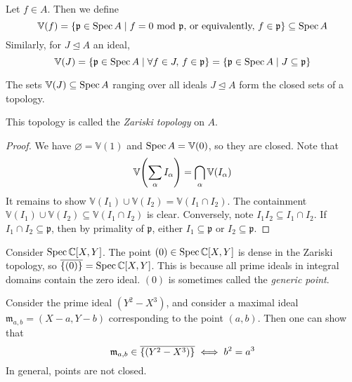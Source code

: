 \begin{definition}
    Let \( f \in A \).
    Then we define
    \[ \mathbb V(f) = \qty{\mathfrak p \in \operatorname{Spec}A \mid f = 0 \text{ mod } \mathfrak p \text{, or equivalently, } f \in \mathfrak p} \subseteq \operatorname{Spec} A \]
    Similarly, for \( J \trianglelefteq A \) an ideal,
    \[ \mathbb V(J) = \qty{\mathfrak p \in \operatorname{Spec}A \mid \forall f \in J,\, f \in \mathfrak p} = \qty{\mathfrak p \in \operatorname{Spec}A \mid J \subseteq \mathfrak p} \]
\end{definition}
\begin{proposition}
    The sets \( \mathbb V(J) \subseteq \operatorname{Spec} A \) ranging over all ideals \( J \trianglelefteq A \) form the closed sets of a topology.
\end{proposition}
This topology is called the \emph{Zariski topology} on \( A \).
\begin{proof}
    We have \( \varnothing = \mathbb V(1) \) and \( \operatorname{Spec} A = \mathbb V(0) \), so they are closed.
    Note that
    \[ \mathbb V\qty(\sum_\alpha I_\alpha) = \bigcap_\alpha \mathbb V(I_\alpha) \]
    It remains to show \( \mathbb V(I_1) \cup \mathbb V(I_2) = \mathbb V(I_1 \cap I_2) \).
    The containment \( \mathbb V(I_1) \cup \mathbb V(I_2) \subseteq \mathbb V(I_1 \cap I_2) \) is clear.
    Conversely, note \( I_1 I_2 \subseteq I_1 \cap I_2 \).
    If \( I_1 \cap I_2 \subseteq \mathfrak p \), then by primality of \( \mathfrak p \), either \( I_1 \subseteq \mathfrak p \) or \( I_2 \subseteq \mathfrak p \).
\end{proof}
\begin{example}
    Consider \( \operatorname{Spec} \mathbb C[X, Y] \).
    The point \( (0) \in \operatorname{Spec} \mathbb C[X, Y] \) is dense in the Zariski topology, so \( \overline{\qty{(0)}} = \operatorname{Spec} \mathbb C[X, Y] \).
    This is because all prime ideals in integral domains contain the zero ideal.
    \( (0) \) is sometimes called the \emph{generic point}.
    
    Consider the prime ideal \( (Y^2 - X^3) \), and consider a maximal ideal \( \mathfrak m_{a,b} = (X - a, Y - b) \) corresponding to the point \( (a, b) \).
    Then one can show that
    \[ \mathfrak m_{a,b} \in \overline{\qty{(Y^2 - X^3)}} \iff b^2 = a^3 \]
    In general, points are not closed.
\end{example}

